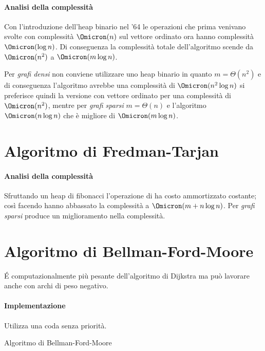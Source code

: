 \paragraph{Analisi della complessità}
Con l'introduzione dell'heap binario nel '64 le operazioni che prima venivano svolte con complessità \(\Omicron(n)\) sul vettore ordinato ora hanno complessità \(\Omicron(\log n)\).
Di conseguenza la complessità totale dell'algoritmo scende da \(\Omicron(n^2)\) a \(\Omicron(m \log n)\).

Per \emph{grafi densi} non conviene utilizzare uno heap binario in quanto \(m = \Theta(n^2)\) e di conseguenza l'algoritmo avrebbe una complessità di \(\Omicron(n^2 \log n)\) si preferisce quindi la versione con vettore ordinato per una complessità di \(\Omicron(n^2)\), mentre per \emph{grafi sparsi} \(m = \Theta(n)\) e l'algoritmo \(\Omicron(n \log n)\) che è migliore di \(\Omicron(m \log n)\).

\section{Algoritmo di Fredman-Tarjan}

\paragraph{Analisi della complessità}
Sfruttando un heap di fibonacci l'operazione di \heapDecrease ha costo ammortizzato costante; così facendo hanno abbassato la complessità a \(\Omicron(m + n \log n)\).
Per \emph{grafi sparsi} produce un miglioramento nella complessità.

\newpage
\section{Algoritmo di Bellman-Ford-Moore}

\begin{note}
\'E computazionalmente più pesante dell'algoritmo di Dijkstra ma può lavorare anche con archi di peso negativo.
\end{note}

\paragraph{Implementazione}
Utilizza una coda senza priorità.

\begin{algorithm}[H]
	\caption{Algoritmo di Bellman-Ford-Moore}
	
\end{algorithm}

